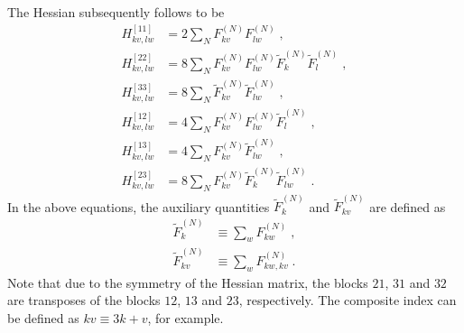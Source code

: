 \documentclass[aip,amsmath,amssymb,reprint,floatfix]{revtex4-1}
\begin{document}
%
The Hessian subsequently follows to be
%
\begin{subequations}
 \begin{align}
  H^{[11]}_{kv,lw} &= 2\sum_N F^{(N)}_{kv} F^{(N)}_{lw} \;,\\
  H^{[22]}_{kv,lw} &= 8\sum_N F^{(N)}_{kv} F^{(N)}_{lw} \widetilde{F}^{(N)}_k \widetilde{F}^{(N)}_l \;,\\
  H^{[33]}_{kv,lw} &= 8\sum_N \widetilde{F}^{(N)}_{kv} \widetilde{F}^{(N)}_{lw} \;,\\
  H^{[12]}_{kv,lw} &= 4\sum_N F^{(N)}_{kv} F^{(N)}_{lw} \widetilde{F}^{(N)}_l \;,\\
  H^{[13]}_{kv,lw} &= 4\sum_N F^{(N)}_{kv} \widetilde{F}^{(N)}_{lw} \;,\\
  H^{[23]}_{kv,lw} &= 8\sum_N F^{(N)}_{kv} \widetilde{F}^{(N)}_k \widetilde{F}^{(N)}_{lw} \;.
 \end{align}
\end{subequations}
%
In the above equations, the auxiliary quantities $\widetilde{F}^{(N)}_k$ 
and $\widetilde{F}^{(N)}_{kv}$ are defined as
%
\begin{subequations}
 \begin{align}
  \widetilde{F}^{(N)}_k    &\equiv \sum_w F^{(N)}_{kw} \;,\\
  \widetilde{F}^{(N)}_{kv} &\equiv \sum_w F^{(N)}_{kw,kv} \;.
 \end{align}
\end{subequations}
%
Note that due to the symmetry of the Hessian matrix, the blocks $21$, $31$ and $32$
are transposes of the blocks $12$, $13$ and $23$, respectively. The composite index
can be defined as $kv \equiv 3k+v$, for example.

\end{document}
